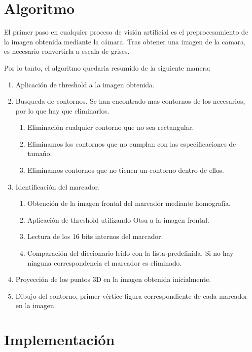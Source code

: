 \documentclass{article}
\begin{document}
\newpage
\section{Algoritmo}

El primer paso en cualquier proceso de visión artificial es el preprocesamiento de la imagen obtenida mediante la cámara. Tras obtener una imagen de la camara, es necesario convertirla a escala de grises.


Por lo tanto, el algoritmo quedaria resumido de la siguiente manera:

\begin{enumerate}
\item Aplicación de threshold a la imagen obtenida.

\item Busqueda de contornos. Se han encontrado mas contornos de los necesarios, por lo que hay que eliminarlos.
  \begin{enumerate}
  \item Eliminación cualquier contorno que no sea rectangular.
  \item Eliminamos los contornos que no cumplan con las especificaciones de tamaño.
  \item Eliminamos contornos que no tienen un contorno dentro de ellos.
  \end{enumerate}

\item Identificación del marcador.
  \begin{enumerate}
  \item Obtención de la imagen frontal del marcador mediante homografía.
  \item Aplicación de threshold utilizando Otsu a la imagen frontal.
  \item Lectura de los 16 bits internos del marcador.
    \item Comparación del diccionario leido con la lista predefinida. Si no hay ninguna correspondencia el marcador es eliminado.
    \end{enumerate}

  \item Proyección de los puntos 3D en la imagen obtenida inicialmente.
  \item Dibujo del contorno, primer vértice figura correspondiente de cada marcador en la imagen.
\end{enumerate}


\section{Implementación}
\end{document}
